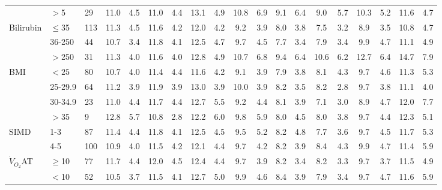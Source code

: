 \begin{sidewaystable}[p]
\begin{tabular}{|l ll | cc cc cc cc cc cc cc cc|}
		                    & $>$5      & 29    & 11.0  & 4.5 & 11.0  & 4.4 & 13.1  & 4.9 & 10.8  & 6.9 & 9.1   & 6.4 & 9.0   & 5.7 & 10.3  & 5.2 & 11.6  & 4.7 \\
		Bilirubin           & $\leq$35  & 113   & 11.3  & 4.5 & 11.6  & 4.2 & 12.0  & 4.2 & 9.2   & 3.9 & 8.0   & 3.8 & 7.5   & 3.2 & 8.9   & 3.5 & 10.8  & 4.7 \\
		                    & 36-250    & 44    & 10.7  & 3.4 & 11.8  & 4.1 & 12.5  & 4.7 & 9.7   & 4.5 & 7.7   & 3.4 & 7.9   & 3.4 & 9.9   & 4.7 & 11.1  & 4.9 \\
		                    & $>$250    & 31    & 11.3  & 4.0 & 11.6  & 4.0 & 12.8  & 4.9 & 10.7  & 6.8 & 9.4   & 6.4 & 10.6  & 6.2 & 12.7  & 6.4 & 14.7  & 7.9 \\
		BMI                 & $<25$     & 80    & 10.7  & 4.0 & 11.4  & 4.4 & 11.6  & 4.2 & 9.1   & 3.9 & 7.9   & 3.8 & 8.1   & 4.3 & 9.7   & 4.6 & 11.3  & 5.3 \\
		                    & 25-29.9   & 64    & 11.2  & 3.9 & 11.9  & 3.9 & 13.0  & 3.9 & 10.0  & 3.9 & 8.2   & 3.5 & 8.2   & 2.8 & 9.7   & 3.8 & 11.1  & 4.0 \\
		                    & 30-34.9   & 23    & 11.0  & 4.4 & 11.7  & 4.4 & 12.7  & 5.5 & 9.2   & 4.4 & 8.1   & 3.9 & 7.1   & 3.0 & 8.9   & 4.7 & 12.0  & 7.7 \\
		                    & $>$35     & 9     & 12.8  & 5.7 & 10.8  & 2.8 & 12.2  & 6.0 & 9.8   & 5.9 & 8.0   & 4.5 & 8.0   & 3.8 & 9.7   & 4.4 & 12.3  & 5.1 \\
		SIMD                & 1-3       & 87    & 11.4  & 4.4 & 11.8  & 4.1 & 12.5  & 4.5 & 9.5   & 5.2 & 8.2   & 4.8 & 7.7   & 3.6 & 9.7   & 4.5 & 11.7  & 5.3 \\
		                    & 4-5       & 100   & 10.9  & 4.0 & 11.5  & 4.2 & 12.1  & 4.4 & 9.7   & 4.2 & 8.2   & 3.9 & 8.4   & 4.3 & 9.9   & 4.7 & 11.4  & 5.9 \\
		$\dot{V}_{O_2}$AT   & $\geq$10  & 77    & 11.7  & 4.4 & 12.0  & 4.5 & 12.4  & 4.4 & 9.7   & 3.9 & 8.2   & 3.4 & 8.2   & 3.3 & 9.7   & 3.7 & 11.5  & 4.9 \\
		                    & $<$10     & 52    & 10.5  & 3.7 & 11.5  & 4.1 & 12.7  & 5.0 & 9.9   & 4.6 & 8.4   & 3.9 & 7.9   & 3.4 & 9.7   & 4.7 & 11.6  & 5.9 \\

\end{tabular}
\end{sidewaystable}
